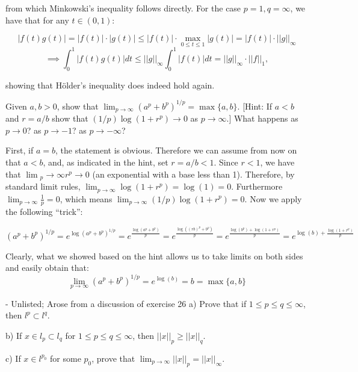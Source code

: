 \begin{solution}
    from which Minkowski's inequality follows directly.
    For the case $p = 1, q = \infty$, we have that for any $t \in (0, 1)$:

    $$\lvert f(t) g(t) \rvert = \lvert f(t) \rvert \cdot \lvert g(t) \rvert \leq \lvert f(t) \rvert \cdot \max_{0 \leq t \leq 1} \lvert g(t) \rvert = \lvert f(t) \rvert \cdot \lvert \lvert g \rvert \rvert_{\infty}$$
    $$\implies \int_{0}^{1} \lvert f(t) g(t) \rvert dt \leq \lvert \lvert g \rvert \rvert_{\infty} \int_{0}^{1} \lvert f(t) \rvert dt = \lvert \lvert g \rvert \rvert_{\infty} \cdot \lvert \lvert f \rvert \rvert_{1},$$

    showing that Hölder's inequality does indeed hold again.
\end{solution}

\begin{exercise}{26}
    Given $a, b > 0$, show that $\lim_{p \rightarrow \infty}(a^p + b^p)^{1/p} = \max\{a, b\}$. [Hint: If $a < b$ and $r = a/b$ show that $(1/p)\log(1 + r^p) \rightarrow 0$ as $p \rightarrow \infty$.] What happens as $p \rightarrow 0$? as $p \rightarrow -1$? as $p \rightarrow -\infty$?
\end{exercise}

\begin{solution}
    
    First, if $a = b$, the statement is obvious.
    Therefore we can assume from now on that $a < b$, and, as indicated in the hint, set $r = a / b < 1$.
    Since $r < 1$, we have that $\lim{_p \rightarrow \infty} r^p \rightarrow 0$ (an exponential with a base less than 1).
    Therefore, by standard limit rules, $\lim_{p \rightarrow \infty} \log(1 + r^p) = \log(1) = 0$. 
    Furthermore $\lim_{p \rightarrow \infty} \frac{1}{p} = 0$, which means $\lim_{p \rightarrow \infty} (1/p)\log(1 + r^p) = 0$.
    Now we apply the following ``trick'':

    $$(a^p + b^p)^{1/p} = e^{\log(a^p + b^p)^{1/p}} = e^{\frac{\log(a^p + b^p)}{p}} = e^{\frac{\log((rb)^p + b^p)}{p}} = e^{\frac{\log(b^p) + \log(1 + r^p)}{p}} = e^{\log(b) + \frac{\log(1 + r^p)}{p}}$$
    
    Clearly, what we showed based on the hint allows us to take limits on both sides and easily obtain that:
    $$\lim_{p \rightarrow \infty}(a^p + b^p)^{1/p} = e^{\log(b)} = b = \max\{a, b\}$$
\end{solution}

\begin{exercise}{ - Unlisted; Arose from a discussion of exercise 26}
    a) Prove that if $1 \leq p \leq q \leq \infty$, then $l^p \subset l^q$.

    b) If $x \in l_p \subset l_q$ for $1 \leq p \leq q \leq \infty$, then $\lvert \lvert x \rvert \rvert_p \geq \lvert \lvert x \rvert \rvert_q$.

    c) If $x \in l^{p_0}$ for some $p_0$, prove that $\lim_{p \rightarrow \infty} \lvert \lvert x \rvert \rvert_p = \lvert \lvert x \rvert \rvert _\infty$.
\end{exercise}


